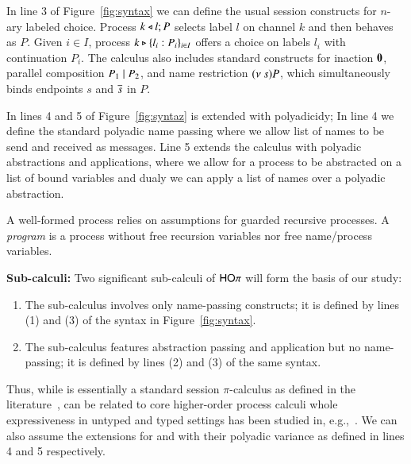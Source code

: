 In line 3 of Figure~\ref{fig:syntax} we can define the usual session constructs
for $n$-ary labeled choice.
Process $k \triangleleft l ; P$ selects label $l$ on channel $k$ and then behaves as $P$. 
Given $i \in I$, 
process $k \triangleright \{l_i:P_i\}_{i \in I}$ offers a choice on labels $l_i$ with
continuation $P_i$.
The calculus also includes standard constructs for 
inaction $\mathbf{0}$, 
parallel composition $P_1 \;|\; P_2$, and 
name restriction $(\nu\ s) P$, which simultaneously binds endpoints $s$ and $\overline{s}$ in $P$.

In lines 4 and 5 of Figure~\ref{fig:syntaz} \HOp is extended with polyadicidy;
In line 4 we define the standard polyadic name passing where we allow 
list of names to be send and received as messages. 
Line 5 extends the calculus with polyadic abstractions and applications,
where we allow for a process to be abstracted on a list of
bound variables and dualy we can apply a list of names
over a polyadic abstraction.

A well-formed process relies on assumptions for guarded recursive processes.
A \emph{program} is a process without free 
recursion variables nor free name/process variables.



{\bf Sub-calculi:}
Two significant sub-calculi of $\mathsf{HO}\pi$ will form the basis of our study:
%
\begin{enumerate}[-]
	\item	The sub-calculus \sesp involves only name-passing constructs; it is 
		defined by lines (1) and (3) of the syntax in Figure~\ref{fig:syntax}.

	\item	The sub-calculus \HO features abstraction passing and application but no name-passing; 
		it is defined by lines (2) and (3) of the same syntax.
\end{enumerate}
%
Thus, while \sesp is essentially a standard session $\pi$-calculus as defined in the literature~\cite{},
\HO can be related to core higher-order process calculi whole expressiveness in untyped and typed settings
has been studied in, e.g.,~\cite{}. We can also assume the extensions for \sesp and \HO with their
polyadic variance as defined in lines 4 and 5 respectively.


